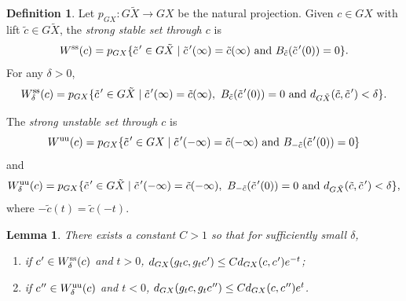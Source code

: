 \documentclass[JEP,XML,SOM,Unicode,NoFloatCountersInSection]{cedram}
\let\sep\mid
\newcommand{\cpr}{c\mkern1mu'}
\newcommand{\tcpr}{\tilde c\mkern2mu'}
\newcommand{\sts}{\mathrm{ss}}
\newcommand{\uu}{\mathrm{uu}}
\newtheorem{lem}[thm]{Lemma}
\theoremstyle{definition}
\newtheorem{defn}[thm]{Definition}
\numberwithin{equation}{section}
\begin{document}
\begin{defn}
Let $p_{GX}:G\tilde X \to GX$ be the natural projection. Given $c\in GX$ with lift $\tilde c\in G\tilde X$, the \emph{strong stable set through $c$} is
\[ W^{\sts}(c) = p_{GX}\{ \tcpr \in G\tilde X \sep \tcpr(\infty) = \tilde c(\infty) \mbox{ and } B_{\tilde c}(\tcpr(0)) = 0\}. \]
For any $\delta>0$,
\[ W^{\sts}_\delta(c) = p_{GX}\{ \tcpr \in G\tilde X \sep \tcpr(\infty) = \tilde c(\infty), \ B_{\tilde c}(\tcpr(0)) = 0 \mbox{ and } d_{G\tilde X}(\tilde c,\tcpr)<\delta \}. \]

The \emph{strong unstable set through $c$} is
\[W^{\uu}(c) = p_{GX}\{ \tcpr \in GX \sep \tcpr(-\infty) = \tilde c(-\infty) \mbox{ and } B_{-\tilde c}(\tcpr(0)) = 0\}\] and \[ W^{\uu}_\delta(c) = p_{GX}\{ \tcpr \in G\tilde X \sep \tcpr(-\infty) = \tilde c(-\infty), \ B_{-\tilde c}(\tcpr(0)) = 0 \mbox{ and } d_{G\tilde X}(\tilde c,\tcpr)<\delta \},\] where $-\tilde c(t) = \tilde c(-t)$.
\end{defn}

\begin{lem}\label{lem:contract}
There exists a constant $C>1$ so that for sufficiently small $\delta$,
\begin{enumerate}
\item if $\cpr \in W^{\sts}_\delta(c)$ and $t>0$, $d_{GX}(g_tc, g_t\cpr) \leq C d_{GX}(c, \cpr) e^{-t}$;
\item if $\cpr' \in W^{\uu}_\delta(c)$ and $t<0$, $d_{GX}(g_tc, g_t\cpr') \leq C d_{GX}(c, \cpr') e^{t}$.
\end{enumerate}
\end{lem}
\end{document}
